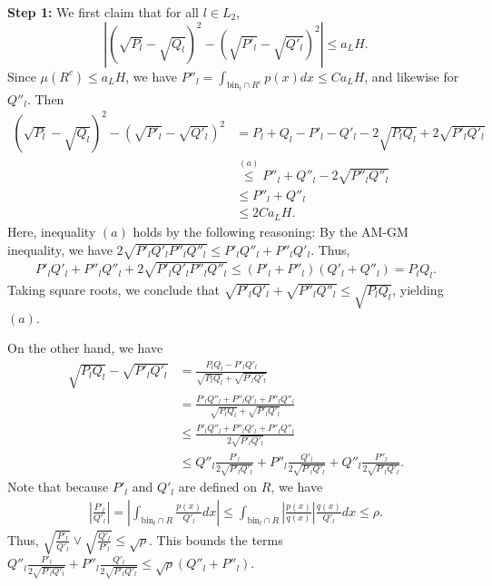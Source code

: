 \documentclass{article}
\newcommand{\bin}{\text{bin}}
\begin{document}
\textbf{Step 1:} We first claim that for all $l \in L_2$, 
\[
\left| (\sqrt{P_l} - \sqrt{Q_l})^2 - (\sqrt{P'_l} - \sqrt{Q'_l})^2 \right| \leq a_L H.
\]
Since $\mu(R^c) \leq a_L H$, we have $P''_l = \int_{\bin_l \cap R^c} p(x) dx \leq C a_L H$, and likewise for $Q''_l$. Then
\begin{align*}
(\sqrt{P_l} - \sqrt{Q_l})^2 - (\sqrt{P'_l} - \sqrt{Q'_l})^2 &=
   P_l + Q_l - P'_l - Q'_l - 2 \sqrt{P_l Q_l} + 2 \sqrt{P'_l Q'_l} \\
  &\stackrel{(a)}\leq P''_l + Q''_l - 2 \sqrt{P''_l Q''_l} \\
  &\leq P''_l + Q''_l \\
  &\leq 2 C a_L H.
\end{align*}
Here, inequality $(a)$ holds by the following reasoning: By the AM-GM inequality, we have $2 \sqrt{P'_l Q'_l P''_l Q''_l} \leq P'_l Q''_l + P''_l Q'_l$. Thus,
\begin{align*}
P'_l Q'_l + P''_l Q''_l + 2 \sqrt{P'_l Q'_l P''_l Q''_l } \leq (P'_l + P''_l)(Q'_l + Q''_l) = P_l Q_l.
\end{align*}
Taking square roots, we conclude that $\sqrt{P'_l Q'_l} + \sqrt{P''_l Q''_l}   \leq \sqrt{ P_lQ_l}$, 
yielding $(a)$.

On the other hand, we have
\begin{align*}
\sqrt{P_l Q_l} - \sqrt{P'_l Q'_l} 
  &= \frac{ P_l Q_l  - P'_l Q'_l }
          {  \sqrt{P_l Q_l} + \sqrt{P'_l Q'_l} }\\
  &= \frac{ P'_l Q''_l + P''_l Q'_l + P''_l Q''_l} 
          {  \sqrt{ P_l Q_l } + \sqrt{P'_l Q'_l} } \\
  &\leq  \frac{ P'_l Q''_l + P''_l Q'_l + P''_l Q''_l} 
          {  2 \sqrt{P'_l Q'_l} } \\
  &\leq Q''_l \frac{P'_l}{2 \sqrt{P'_l Q'_l}} + P''_l \frac{Q'_l}{2\sqrt{P'_l Q'_l}}
        + Q''_l \frac{P''_l}{2 \sqrt{P'_l Q'_l}}. 
\end{align*}
Note that because $P'_l$ and $Q'_l$ are defined on $R$, we have
\begin{align*}
\left| \frac{P'_l}{Q'_l} \right| =
\left| \int_{\bin_l \cap R} \frac{ p(x)}{Q'_l} dx \right| 
 \leq \int_{\bin_l \cap R} \left| \frac{p(x)}{q(x)} \right| \frac{q(x)}{Q'_l} dx 
 \leq \rho. 
\end{align*}
Thus, $\sqrt{ \frac{P'_l}{Q'_l} } \vee \sqrt{ \frac{Q'_l}{P'_l}} \leq \sqrt{\rho}$. This bounds the terms $ Q''_l \frac{P'_l}{2 \sqrt{P'_l Q'_l}} + P''_l \frac{Q'_l}{2\sqrt{P'_l Q'_l}} \leq \sqrt{\rho} (Q''_l + P''_l)$. 
\end{document}
